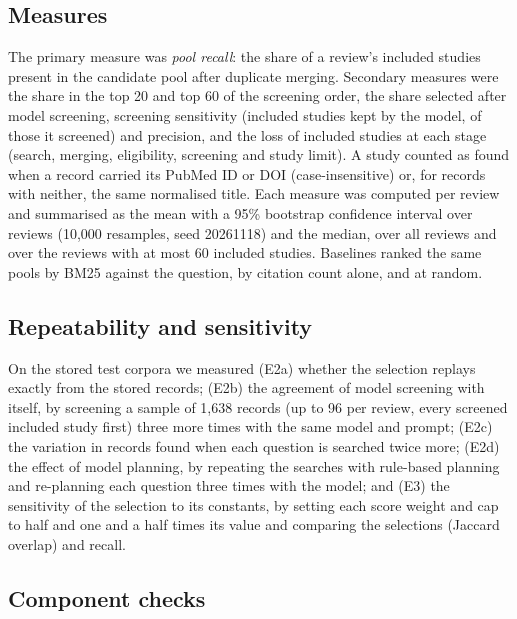 \subsection{Measures}

The primary measure was \emph{pool recall}: the share of a review's included studies present in the candidate pool
after duplicate merging. Secondary measures were the share in the top 20 and top 60 of the screening order, the
share selected after model screening, screening sensitivity (included studies kept by the model, of those it
screened) and precision, and the loss of included studies at each stage (search, merging, eligibility, screening and
study limit). A study counted as found when a record carried its PubMed ID or DOI (case-insensitive) or, for records
with neither, the same normalised title. Each measure was computed per review and summarised as the mean with a 95\%
bootstrap confidence interval over reviews (10,000 resamples, seed 20261118) and the median, over all reviews and
over the reviews with at most 60 included studies. Baselines ranked the same pools by BM25 against the question, by
citation count alone, and at random.

\subsection{Repeatability and sensitivity}

On the stored test corpora we measured (E2a) whether the selection replays exactly from the stored records;
(E2b) the agreement of model screening with itself, by screening a sample of 1,638 records (up to 96 per review,
every screened included study first) three more times with the same model and prompt; (E2c) the variation in
records found when each question is searched twice more; (E2d) the effect of model planning, by repeating the
searches with rule-based planning and re-planning each question three times with the model; and (E3) the
sensitivity of the selection to its constants, by setting each score weight and cap to half and one and a half
times its value and comparing the selections (Jaccard overlap) and recall.

\subsection{Component checks}

